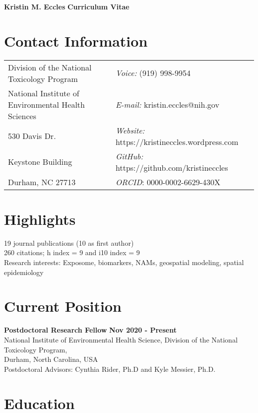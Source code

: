 \documentclass[margin,line]{res}
\begin{document}
\begin{flushleft}
		\huge \textbf{Kristin M. Eccles}
		\hfill {\LARGE \textbf{Curriculum Vitae}}\\
\end{flushleft}


\begin{resume}
\section{\sc Contact Information}
\vspace{.05in}
\begin{tabular}{@{}p{3.2in}p{2.5in}}
Division of the National Toxicology Program & {\it Voice:}  (919) 998-9954 \\
National Institute of Environmental Health Sciences & {\it E-mail:}  kristin.eccles@nih.gov\\
530 Davis Dr. &{\it Website:} https://kristineccles.wordpress.com  \\
Keystone Building  & {\it GitHub:} https://github.com/kristineccles \\
Durham, NC 27713 & {\it ORCID}: 0000-0002-6629-430X

\end{tabular}

\vspace*{.1in}
\section{\sc Highlights}
19 journal publications (10 as first author)
\\
260 citations; h index = 9 and i10 index = 9
\\
Research interests: Exposome, biomarkers, NAMs, geospatial modeling, spatial epidemiology

\vspace*{.1in}
\section{\sc Current    Position}
{\bf  Postdoctoral Research Fellow} \hfill {\bf Nov 2020 - Present}\\
National Institute of Environmental Health Science, Division of the National Toxicology Program,\\
Durham, North Carolina, USA\\
Postdoctoral Advisors: Cynthia Rider, Ph.D and Kyle Messier, Ph.D.

\vspace*{.1in}
\section{\sc Education}


\end{resume}
\end{document}

